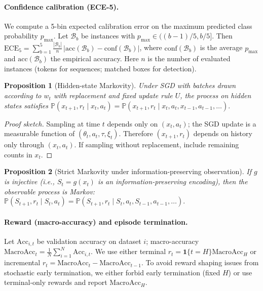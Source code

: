 \documentclass[11pt]{article}
\newtheorem{proposition}{Proposition}
\newcommand{\MacroAcc}{\mathrm{MacroAcc}}
\newcommand{\1}{\mathbf{1}}
\newcommand{\Prb}{\mathbb{P}}
\begin{document}
\paragraph{Confidence calibration (ECE-5).}
We compute a 5-bin expected calibration error on the maximum predicted class probability $p_{\max}$.
Let $\mathcal{B}_b$ be instances with $p_{\max}\in((b-1)/5,b/5]$. Then
$\mathrm{ECE}_5=\sum_{b=1}^5 \frac{|\mathcal{B}_b|}{n}\,\big|\mathrm{acc}(\mathcal{B}_b)-\mathrm{conf}(\mathcal{B}_b)\big|$,
where $\mathrm{conf}(\mathcal{B}_b)$ is the average $p_{\max}$ and $\mathrm{acc}(\mathcal{B}_b)$ the empirical accuracy.
Here $n$ is the number of evaluated instances (tokens for sequences; matched boxes for detection).

\begin{proposition}[Hidden-state Markovity]
Under SGD with batches drawn according to $w_t$ \emph{with replacement} and fixed update rule $U$, the process on hidden states satisfies
\(
\Prb(x_{t+1},r_t \mid x_t,a_t)=\Prb(x_{t+1},r_t \mid x_t,a_t,x_{t-1},a_{t-1},\dots).
\)
\end{proposition}
\begin{proof}[Proof sketch]
Sampling at time $t$ depends only on $(x_t,a_t)$; the SGD update is a measurable function of $(\theta_t,a_t,\tau,\xi_t)$.
Therefore $(x_{t+1},r_t)$ depends on history only through $(x_t,a_t)$.
If sampling without replacement, include remaining counts in $x_t$.
\end{proof}

\begin{proposition}[Strict Markovity under information-preserving observation]\label{prop:inject}
If $g$ is injective (i.e., $S_t=g(x_t)$ is an information-preserving encoding), then the observable process is Markov:
\(
\Prb(S_{t+1},r_t \mid S_t,a_t)=\Prb(S_{t+1},r_t \mid S_t,a_t,S_{t-1},a_{t-1},\dots).
\)
\end{proposition}

\paragraph{Reward (macro-accuracy) and episode termination.}
Let $\mathrm{Acc}_{i,t}$ be validation accuracy on dataset $i$; macro-accuracy $\MacroAcc_t=\frac{1}{N}\sum_{i=1}^N \mathrm{Acc}_{i,t}$.
We use either terminal $r_t=\1\{t=H\}\MacroAcc_H$ or incremental $r_t=\MacroAcc_t-\MacroAcc_{t-1}$.
To avoid reward shaping issues from stochastic early termination, we either forbid early termination (fixed $H$) or use terminal-only rewards and report $\MacroAcc_H$.
\end{document}
